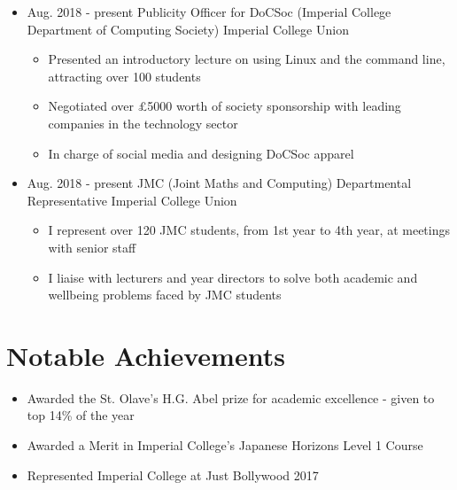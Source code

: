 \documentclass[11pt,a4paper,sans]{moderncv}        %
\begin{document}
\begin{itemize}

\item{
\cventry
{Aug. 2018 - present}
{Publicity Officer for DoCSoc (Imperial College Department of Computing Society)}
{Imperial College Union}
{}{}{
\begin{itemize}
\item Presented an introductory lecture on using Linux and the command line, attracting over 100 students
\item Negotiated over £5000 worth of society sponsorship with leading companies in the technology sector
\item In charge of social media and designing DoCSoc apparel
\end{itemize}
}}

\item{
\cventry
{Aug. 2018 - present}
{JMC (Joint Maths and Computing) Departmental Representative}
{Imperial College Union}
{}{}{
\begin{itemize}
\item I represent over 120 JMC students, from 1st year to 4th year, at meetings with senior staff
\item I liaise with lecturers and year directors to solve both academic and wellbeing problems faced by JMC students
\end{itemize}
}}

\end{itemize}

\section{Notable Achievements}

\begin{itemize}

\item Awarded the St. Olave's H.G. Abel prize for academic excellence - given to top 14\% of the year

\item Awarded a Merit in Imperial College's Japanese Horizons Level 1 Course

\item Represented Imperial College at Just Bollywood 2017

\end{itemize}

\nocite{*}

\end{document}
